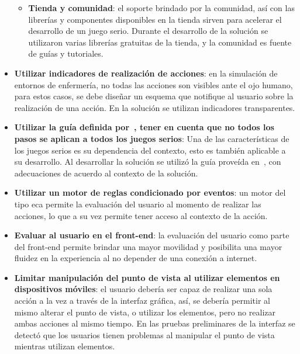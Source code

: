 \begin{itemize}
\begin{itemize}
    \item \textbf{Tienda y comunidad}: el soporte brindado  por la comunidad,
        así con las librerías y componentes disponibles en la tienda sirven para
        acelerar el desarrollo de un juego serio. Durante el desarrollo de la
        solución se utilizaron varias librerías gratuitas de la tienda, y la
        comunidad es fuente de guías y tutoriales.

    \end{itemize}


\item \textbf{Utilizar indicadores de realización de acciones}: en la simulación de
    entornos de enfermería, no todas las acciones son visibles ante el ojo
    humano, para estos casos, se debe diseñar un esquema que notifique al
    usuario sobre la realización de una acción. En la solución se utilizan
    indicadores transparentes.

\item \textbf{Utilizar la guía definida por~\cite{pereira2009design}, tener en
        cuenta que no todos los pasos se aplican a todos los juegos serios}: Una
    de las características de los juegos serios es su dependencia del contexto,
    esto es también aplicable a su desarrollo. Al desarrollar la solución se
    utilizó la guía proveída en~\cite{pereira2009design}, con adecuaciones de
    acuerdo al contexto de la solución.

\item \textbf{Utilizar un motor de reglas condicionado por eventos}: un motor
    del tipo \gls{eca} permite la evaluación del usuario al momento de realizar
    las acciones, lo que a su vez permite tener acceso al contexto de la acción. 

\item \textbf{Evaluar al usuario en el front-end}: la evaluación del usuario
    como parte del front-end permite brindar una mayor movilidad y posibilita
    una mayor fluidez en la experiencia al no depender de una conexión a
    internet. 

\item \textbf{Limitar manipulación del punto de vista al utilizar elementos en dispositivos móviles}: el
    usuario debería ser capaz de realizar una sola acción a la vez a través de
    la interfaz gráfica, así, se debería permitir al mismo alterar el punto de
    vista, o utilizar los elementos, pero no realizar ambas acciones al mismo
    tiempo. En las pruebas preliminares de la interfaz se detectó que los
    usuarios tienen problemas al manipular el punto de vista mientras
    utilizan elementos.


\end{itemize}
